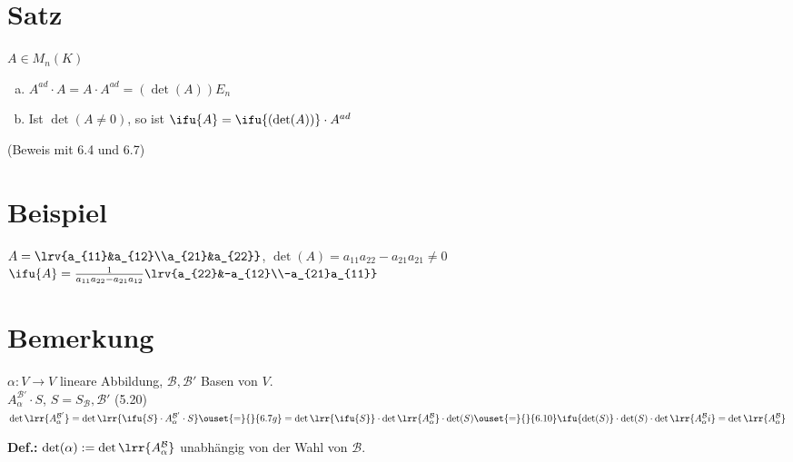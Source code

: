 \section{Satz}
$A\in M_n(K)$
\begin{enumerate}[a)]
  \item $A^{ad}\cdot A=A\cdot A^{ad}=(\det(A))E_n$
  \item Ist $\det(A\neq 0)$, so ist $\ifu{A}=\ifu{(\det(A))}\cdot A^{ad}$
\end{enumerate}
(Beweis mit 6.4 und 6.7)

\section{Beispiel}
$A=\lrv{a_{11}&a_{12}\\a_{21}&a_{22}}$, $\det(A)=a_{11}a_{22}-a_{21}a_{21}\neq 0$\\
$\ifu{A}=\frac{1}{a_{11}a_{22}-a_{21}a_{12}}\lrv{a_{22}&-a_{12}\\-a_{21}a_{11}}$

\section{Bemerkung}
$\alpha:V\rightarrow V$ lineare Abbildung, $\mathcal{B},\mathcal{B}'$ Basen von $V$.\\
$A_\alpha^{\mathcal{B}'}\cdot S$, $S=S_{\mathcal{B}},\mathcal{B}'$ (5.20)\\
$\det\lrr{A_\alpha^{\mathcal{B}'}}=\det\lrr{\ifu{S}\cdot A_\alpha^{\mathcal{B}'}\cdot
S}\ouset{=}{}{6.7g}=\det\lrr{\ifu{S}}\cdot\det\lrr{A_\alpha^{\mathcal{B}}}\cdot\det(S)\ouset{=}{}{6.10}\ifu{\det(S)}\cdot\det(S)\cdot\det\lrr{A_\alpha^{\mathcal{B}}i}=\det\lrr{A_\alpha^{\mathcal{B}}}$

\textbf{Def.:} $\det(\alpha):=\det\lrr{A_\alpha^{\mathcal{B}}}$ unabhängig von
der Wahl von $\mathcal{B}$.
